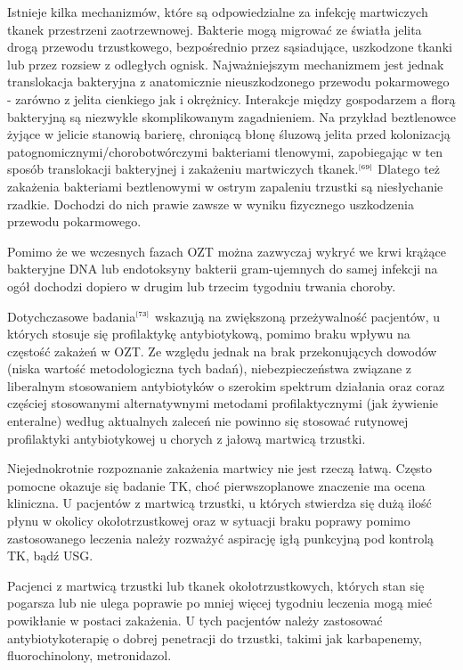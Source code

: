 \documentclass[a4paper, 12pt]{report}
\newcommand\cyt[1]{$^{\tiny{\cite{#1}}}$}
\begin{document}
Istnieje kilka mechanizmów, które są odpowiedzialne za infekcję
martwiczych tkanek przestrzeni zaotrzewnowej. Bakterie mogą migrować
ze światła jelita drogą przewodu trzustkowego, bezpośrednio przez
sąsiadujące, uszkodzone tkanki lub przez rozsiew z odległych
ognisk. Najważniejszym mechanizmem jest jednak translokacja bakteryjna
z anatomicznie nieuszkodzonego przewodu pokarmowego - zarówno z jelita
cienkiego jak i okrężnicy. Interakcje między gospodarzem a florą
bakteryjną są niezwykle skomplikowanym zagadnieniem. Na przykład
beztlenowce żyjące w jelicie stanowią barierę, chroniącą błonę śluzową
jelita przed kolonizacją patognomicznymi/chorobotwórczymi bakteriami
tlenowymi, zapobiegając w ten sposób translokacji bakteryjnej i
zakażeniu martwiczych tkanek.\cyt{69} Dlatego też zakażenia bakteriami
beztlenowymi w ostrym zapaleniu trzustki są niesłychanie
rzadkie. Dochodzi do nich prawie zawsze w wyniku fizycznego
uszkodzenia przewodu pokarmowego.

Pomimo że we wczesnych fazach OZT można zazwyczaj wykryć we krwi
krążące bakteryjne DNA lub endotoksyny bakterii gram-ujemnych do samej
infekcji na ogół dochodzi dopiero w drugim lub trzecim tygodniu
trwania choroby.

Dotychczasowe badania\cyt{73} wskazują na zwiększoną przeżywalność
pacjentów, u których stosuje się profilaktykę antybiotykową, pomimo
braku wpływu na częstość zakażeń w OZT. Ze względu jednak na brak
przekonujących dowodów (niska wartość metodologiczna tych badań),
niebezpieczeństwa związane z liberalnym stosowaniem antybiotyków o
szerokim spektrum działania oraz coraz częściej stosowanymi
alternatywnymi metodami profilaktycznymi (jak żywienie enteralne)
według aktualnych zaleceń nie powinno się stosować rutynowej
profilaktyki antybiotykowej u chorych z jałową martwicą trzustki.

Niejednokrotnie rozpoznanie zakażenia martwicy nie jest rzeczą
łatwą. Często pomocne okazuje się badanie TK, choć pierwszoplanowe
znaczenie ma ocena kliniczna. U pacjentów z martwicą trzustki, u
których stwierdza się dużą ilość płynu w okolicy okołotrzustkowej
oraz w sytuacji braku poprawy pomimo zastosowanego leczenia należy
rozważyć aspirację igłą punkcyjną pod kontrolą TK, bądź USG.

Pacjenci z martwicą trzustki lub tkanek okołotrzustkowych, których
stan się pogarsza lub nie ulega poprawie po mniej więcej tygodniu
leczenia mogą mieć powikłanie w postaci zakażenia. U tych pacjentów
należy zastosować antybiotykoterapię o dobrej penetracji do trzustki,
takimi jak karbapenemy, fluorochinolony, metronidazol.
\end{document}
